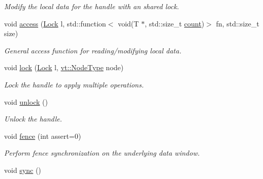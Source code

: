 \begin{DoxyCompactItemize}
\begin{DoxyCompactList}\small\item\em Modify the local data for the handle with an shared lock. \end{DoxyCompactList}\item 
void \hyperlink{structvt_1_1rdma_1_1_handle_3_01_t_00_01_e_00_01_index_t_00_01typename_01std_1_1enable__if__t_3_d15dac1b5db6e2bc0fb0b8aca42b1456_ac55effdd67bf32d8b645004e30ffa095}{access} (\hyperlink{namespacevt_1_1rdma_ac5c20b41a653e520b6305d4d454ecb70}{Lock} l, std\+::function$<$ void(T $\ast$, std\+::size\+\_\+t \hyperlink{structvt_1_1rdma_1_1_base_typed_handle_a1e7937b5cf4b641a783c37675ae2cc35}{count})$>$ fn, std\+::size\+\_\+t size)
\begin{DoxyCompactList}\small\item\em General access function for reading/modifying local data. \end{DoxyCompactList}\item 
void \hyperlink{structvt_1_1rdma_1_1_handle_3_01_t_00_01_e_00_01_index_t_00_01typename_01std_1_1enable__if__t_3_d15dac1b5db6e2bc0fb0b8aca42b1456_a0f1c345ac84d28f8c19f0d02a428c6a1}{lock} (\hyperlink{namespacevt_1_1rdma_ac5c20b41a653e520b6305d4d454ecb70}{Lock} l, \hyperlink{namespacevt_a866da9d0efc19c0a1ce79e9e492f47e2}{vt\+::\+Node\+Type} node)
\begin{DoxyCompactList}\small\item\em Lock the handle to apply multiple operations. \end{DoxyCompactList}\item 
void \hyperlink{structvt_1_1rdma_1_1_handle_3_01_t_00_01_e_00_01_index_t_00_01typename_01std_1_1enable__if__t_3_d15dac1b5db6e2bc0fb0b8aca42b1456_aeb8b31602a46bc22042360280ef88b01}{unlock} ()
\begin{DoxyCompactList}\small\item\em Unlock the handle. \end{DoxyCompactList}\item 
void \hyperlink{structvt_1_1rdma_1_1_handle_3_01_t_00_01_e_00_01_index_t_00_01typename_01std_1_1enable__if__t_3_d15dac1b5db6e2bc0fb0b8aca42b1456_a2b0167a409d6fb571fb87eab5ee07f1e}{fence} (int assert=0)
\begin{DoxyCompactList}\small\item\em Perform fence synchronization on the underlying data window. \end{DoxyCompactList}\item 
void \hyperlink{structvt_1_1rdma_1_1_handle_3_01_t_00_01_e_00_01_index_t_00_01typename_01std_1_1enable__if__t_3_d15dac1b5db6e2bc0fb0b8aca42b1456_aee57964ac3427b7f8a2014ab2256efb1}{sync} ()

\end{DoxyCompactItemize}
